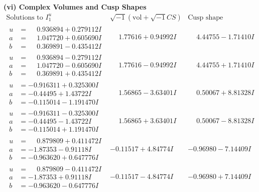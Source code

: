 \documentclass[1p]{elsarticle_modified}
\theoremstyle{definition}
\newcommand{\I}{\sqrt{-1}}
\begin{document}
\newpage\flushleft \textbf{(vi) Complex Volumes and Cusp Shapes}
$$\begin{array}{c|c|c}  
\text{Solutions to }I^u_{1}& \I (\text{vol} + \sqrt{-1}CS) & \text{Cusp shape}\\
 \hline 
\begin{aligned}
u &= \phantom{-}0.936894 + 0.279112 I \\
a &= \phantom{-}1.047720 + 0.605690 I \\
b &= \phantom{-}0.369891 - 0.435412 I\end{aligned}
 & \phantom{-}1.77616 + 0.94992 I & \phantom{-}4.44755 - 1.71410 I \\ \hline\begin{aligned}
u &= \phantom{-}0.936894 - 0.279112 I \\
a &= \phantom{-}1.047720 - 0.605690 I \\
b &= \phantom{-}0.369891 + 0.435412 I\end{aligned}
 & \phantom{-}1.77616 - 0.94992 I & \phantom{-}4.44755 + 1.71410 I \\ \hline\begin{aligned}
u &= -0.916311 + 0.325300 I \\
a &= -0.44495 + 1.43722 I \\
b &= -0.115014 - 1.191470 I\end{aligned}
 & \phantom{-}1.56865 - 3.63401 I & \phantom{-}0.50067 + 8.81328 I \\ \hline\begin{aligned}
u &= -0.916311 - 0.325300 I \\
a &= -0.44495 - 1.43722 I \\
b &= -0.115014 + 1.191470 I\end{aligned}
 & \phantom{-}1.56865 + 3.63401 I & \phantom{-}0.50067 - 8.81328 I \\ \hline\begin{aligned}
u &= \phantom{-}0.879809 + 0.411472 I \\
a &= -1.87353 - 0.91118 I \\
b &= -0.963620 + 0.647776 I\end{aligned}
 & -0.11517 + 4.84774 I & -0.96980 - 7.14409 I \\ \hline\begin{aligned}
u &= \phantom{-}0.879809 - 0.411472 I \\
a &= -1.87353 + 0.91118 I \\
b &= -0.963620 - 0.647776 I\end{aligned}
 & -0.11517 - 4.84774 I & -0.96980 + 7.14409 I \\ \hline\begin{aligned}

\end{aligned}
\end{array}$$
\end{document}
